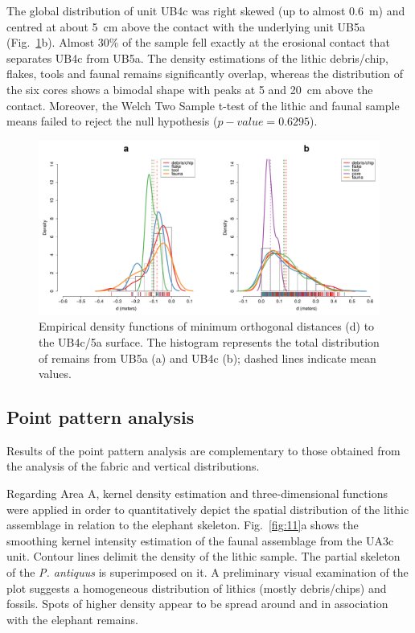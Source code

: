 \documentclass[preprint,authoryear,times]{elsarticle} %
\begin{document}
The global distribution of unit UB4c was right skewed (up to almost 0.6~m) and centred at about 5~cm above the contact with the underlying unit UB5a (Fig.~\ref{fig:10}b). Almost 30\% of the sample fell exactly at the erosional contact that separates UB4c from UB5a. The density estimations of the lithic debris/chip, flakes, tools and faunal remains significantly overlap, whereas the distribution of the six cores shows a bimodal shape with peaks at 5 and 20~cm above the contact. Moreover, the Welch Two Sample t-test of the lithic and faunal sample means failed to reject the null hypothesis ($p-value=0.6295$).

\begin{figure}[]
  \centering
  \includegraphics[width=1\textwidth]{./artwork/Fig10.pdf}
  \caption{Empirical density functions of minimum orthogonal distances (d) to the UB4c/5a surface. The histogram represents the total distribution of remains from UB5a (a) and UB4c (b); dashed lines indicate mean values.}
  \label{fig:10}
\end{figure}

\subsection{Point pattern analysis}

Results of the point pattern analysis are complementary to those obtained from the analysis of the fabric and vertical distributions.  


Regarding Area A, kernel density estimation and three-dimensional functions were applied in order to quantitatively depict the spatial distribution of the lithic assemblage in relation to the elephant skeleton. Fig.~\ref{fig:11}a shows the smoothing kernel intensity estimation of the faunal assemblage from the UA3c unit. Contour lines delimit the density of the lithic sample. The partial skeleton of the \emph{P. antiquus} is superimposed on it. A preliminary visual examination of the plot suggests a homogeneous distribution of lithics (mostly debris/chips) and fossils. Spots of higher density appear to be spread around and in association with the elephant remains.
\end{document}
